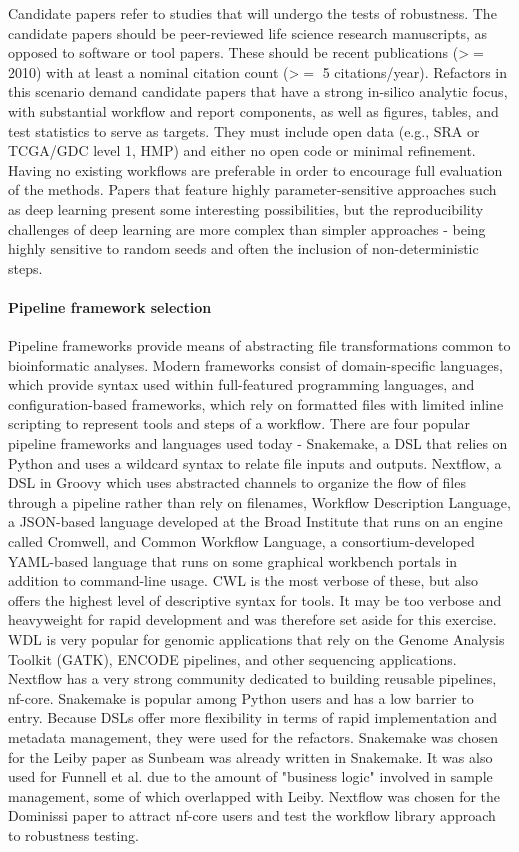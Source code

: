 \documentclass{drexelthesis}
\begin{document}
Candidate papers refer to studies that will undergo the tests of robustness. The candidate papers should be peer-reviewed life science research manuscripts, as opposed to software or tool papers. These should be recent publications (>$=$2010) with at least a nominal citation count (>$=$ 5 citations/year). Refactors in this scenario demand candidate papers that have a strong in-silico analytic focus, with substantial workflow and report components, as well as figures, tables, and test statistics to serve as targets. They must include open data (e.g., SRA or TCGA/GDC level 1, HMP) and either no open code or minimal refinement. Having no existing workflows are preferable in order to encourage full evaluation of the methods. Papers that feature highly parameter-sensitive approaches such as deep learning present some interesting possibilities, but the reproducibility challenges of deep learning are more complex than simpler approaches - being highly sensitive to random seeds and often the inclusion of non-deterministic steps.

\paragraph{Pipeline framework selection}

Pipeline frameworks provide means of abstracting file transformations common to bioinformatic analyses. Modern frameworks consist of domain-specific languages, which provide syntax used within full-featured programming languages, and configuration-based frameworks, which rely on formatted files with limited inline scripting to represent tools and steps of a workflow. There are four popular pipeline frameworks and languages used today - Snakemake, a DSL that relies on Python and uses a wildcard syntax to relate file inputs and outputs. Nextflow, a DSL in Groovy which uses abstracted channels to organize the flow of files through a pipeline rather than rely on filenames, Workflow Description Language, a JSON-based language developed at the Broad Institute that runs on an engine called Cromwell, and Common Workflow Language, a consortium-developed YAML-based language that runs on some graphical workbench portals in addition to command-line usage. CWL is the most verbose of these, but also offers the highest level of descriptive syntax for tools. It may be too verbose and heavyweight for rapid development and was therefore set aside for this exercise. WDL is very popular for genomic applications that rely on the Genome Analysis Toolkit (GATK), ENCODE pipelines, and other sequencing applications. Nextflow has a very strong community dedicated to building reusable pipelines, nf-core. Snakemake is popular among Python users and has a low barrier to entry. Because DSLs offer more flexibility in terms of rapid implementation and metadata management, they were used for the refactors. Snakemake was chosen for the Leiby paper as Sunbeam was already written in Snakemake. It was also used for Funnell et al. due to the amount of "business logic" involved in sample management, some of which overlapped with Leiby. Nextflow was chosen for the Dominissi paper to attract nf-core users and test the workflow library approach to robustness testing.
\end{document}
